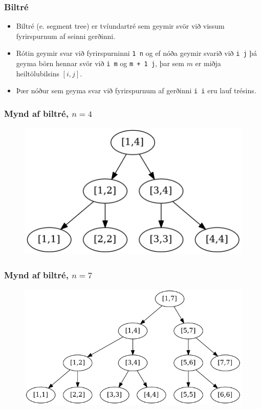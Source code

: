 \documentclass{beamer}
\begin{document}
\begin{frame}
\frametitle{Biltré}
\begin{itemize}
\item<1-> Biltré (e. segment tree) er tvíundartré sem geymir svör við vissum fyrirspurnum af seinni gerðinni.
\item<2-> Rótin geymir svar við fyrirspurninni \texttt{1 n} 
og ef nóða geymir svarið við \texttt{i j} þá geyma börn hennar svör við \texttt{i m} og \texttt{m + 1 j}, þar sem $m$ er miðja heiltölubilsins $[i, j]$.
\item<3-> Þær nóður sem geyma svar við fyrirspurnum af gerðinni \texttt{i i} eru lauf trésins.
\end{itemize}
\end{frame}

\begin{frame}
\frametitle{Mynd af biltré, $n = 4$}
	\begin{figure}
		\includegraphics[scale=0.5]{mynd2.png}
	\end{figure}
\end{frame}

\begin{frame}
\frametitle{Mynd af biltré, $n = 7$}
	\begin{figure}
		\includegraphics[scale=0.3]{mynd3.png}
	\end{figure}
\end{frame}
\end{document}
